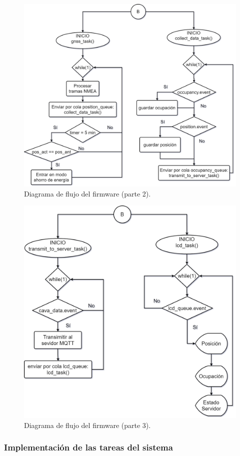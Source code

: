 \begin{figure}
	\centering
	\includegraphics[width=.8\textwidth]{./Figures/Diagrama_flujo_firmware_TFE_CESE_Part_2.png}
	\caption{Diagrama de flujo del firmware (parte 2).}
	\label{fig:flujo_firmware_2}
\end{figure}

\begin{figure}
	\centering
	\includegraphics[width=.8\textwidth]{./Figures/Diagrama_flujo_firmware_TFE_CESE_Part_3.png}
	\caption{Diagrama de flujo del firmware (parte 3).}
	\label{fig:flujo_firmware_3}
\end{figure}


\subsubsection{Implementación de las tareas del sistema}

